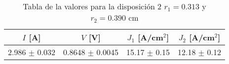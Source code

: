 \begin{table}[H]
    \centering
\begin{tabular}{cccc}
\toprule
$I$ [A] & $V$ [V] & $J_1$ [A/cm$^2$] & $J_2$ [A/cm$^2$] \\
\midrule
2.986 $\pm$ 0.032 & 0.8648 $\pm$ 0.0045 & 15.17 $\pm$ 0.15 & 12.18 $\pm$ 0.12 \\
\bottomrule
\end{tabular}
    \caption{Tabla de la valores para la disposición 2 $r_1=0.313$ y $r_2=0.390$ cm }
    \label{Tab:VIJ_mini_2}
\end{table}
